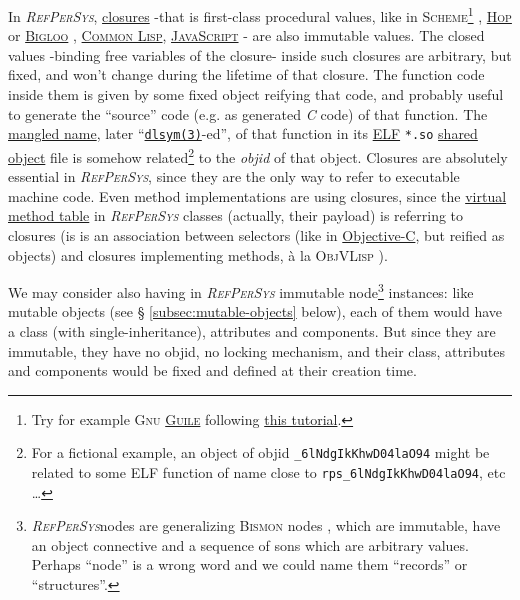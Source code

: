 \documentclass[11pt,a4paper,svgnames]{article}
\newcommand{\RefPerSys}{{\textit{\textsc{RefPerSys}}}}
\begin{document}
In {\RefPerSys},
\href{https://en.wikipedia.org/wiki/Closure_(computer_programming)}{closures}
-that is first-class procedural values, like in
\textsc{Scheme}\footnote{Try for example \textsc{Gnu}
  \href{https://www.gnu.org/software/guile/}{\textsc{Guile}} following
  \href{http://starynkevitch.net/Basile/guile-tutorial-1.html}{this
    tutorial}.} \cite{kelsey:1998:r5rs, matthews:2005:operational,
  Queinnec:1996:LSP, Queinnec:2004:ContinWeb, abelson:1996:sicp},
\href{http://hop.inria.fr/home/index.html}{\textsc{Hop}} or
\href{https://www-sop.inria.fr/mimosa/fp/Bigloo/}{\textsc{Bigloo}}
\cite{serrano:1995:bigloo},
\href{http://www.lispworks.com/documentation/HyperSpec/Front/index.htm}{\textsc{Common
    Lisp}},
\href{https://en.wikipedia.org/wiki/JavaScript}{\textsc{JavaScript}} -
are also immutable values. The closed values -binding free variables
of the closure- inside such closures are arbitrary, but fixed, and
won't change during the lifetime of that closure. The function code
inside them is given by some fixed object reifying that code, and
probably useful to generate the ``source'' code (e.g. as generated
\emph{C} code) of that function. The
\href{https://en.wikipedia.org/wiki/Name_mangling}{mangled name},
later
``\href{http://man7.org/linux/man-pages/man3/dlsym.3.html}{\texttt{dlsym(3)}}-ed'',
of that function in its
\href{https://en.wikipedia.org/wiki/Executable_and_Linkable_Format}{ELF}
\texttt{*.so}
\href{https://en.wikipedia.org/wiki/Library\_(computing)\#Shared\_libraries}{shared
  object} file \cite{drepper:2011:write-shared-lib,
  levine:1999:linkers-loaders} is somehow related\footnote{For a
  fictional example, an object of objid \texttt{\_6lNdgIkKhwD04laO94}
  might be related to some ELF function of name close to
  \texttt{rps\_6lNdgIkKhwD04laO94}, etc \ldots} to the \emph{objid} of
that object. Closures are absolutely essential in {\RefPerSys}, since
they are the only way to refer to executable machine code. Even method
implementations are using closures, since the
\href{https://en.wikipedia.org/wiki/Virtual_method_table}{virtual
  method table} in {\RefPerSys} classes (actually, their payload) is
referring to closures (is is an association between selectors (like in
\href{https://en.wikipedia.org/wiki/Objective-C\#Messages}{Objective-C},
but reified as objects) and closures implementing methods, à la
\textsc{ObjVLisp} \cite{cointe:1987:metaclasses,
  abadi:1995:imperative}).

We may consider also having in {\RefPerSys} immutable
node\footnote{\RefPerSys nodes are generalizing \textsc{Bismon} nodes
\cite{Starynkevitch:2019:bismon-draft}, which are immutable, have an
object connective and a sequence of sons which are arbitrary
values. Perhaps ``node'' is a wrong word and we could name them
``records'' or ``structures''.}  instances: like mutable objects (see \S
\ref{subsec:mutable-objects} below), each of them would have a class
(with single-inheritance), attributes and components. But since they
are immutable, they have no objid, no locking mechanism, and their
class, attributes and components would be fixed and defined at their
creation time.
\end{document}
